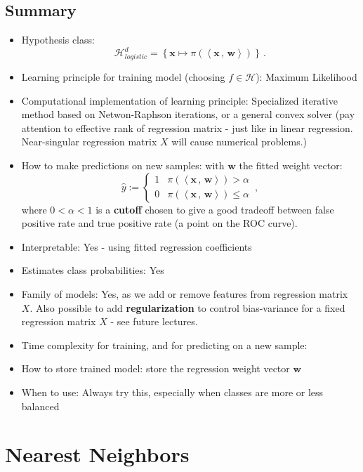\documentclass[11pt]{article}
\newcommand{\Hc}{\mathcal{H}}
\newcommand{\innerr}[2]{{\left\langle #1\,,\,#2 \right\rangle}}
\newcommand{\VV}[1]{\mathbf{#1}}
\begin{document}
\subsection{Summary}
\begin{itemize}
  \item Hypothesis class: 
    \[
	\Hc_{logistic}^d= \left\{ \VV{x} \mapsto \pi(\innerr{\VV{x}}{\VV{w}} ) \right\}\,.
      \]

     \item Learning principle for training model (choosing $f\in\Hc$): Maximum Likelihood 
    \item Computational implementation of learning principle: Specialized
      iterative method based on Netwon-Raphson
      iterations, or a general convex solver
      (pay attention to effective rank of regression matrix -
      just like in linear regression. Near-singular regression matrix $X$ will
    cause numerical problems.)
  \item How to make predictions on new samples: with $\VV{w}$ the fitted weight
    vector:
    \[\hat{y} := \begin{cases} 1 & \pi(\innerr{\VV{x}}{\VV{w}})>\alpha \\ 0 &
    \pi(\innerr{\VV{x}}{\VV{w}}) \leq \alpha \end{cases}\,,\]
    where $0<\alpha<1$ is a {\bf cutoff} chosen to give a good tradeoff between
    false positive rate and true positive rate (a point on the ROC curve).
  \item Interpretable: Yes - using fitted regression coefficients
    \item Estimates class probabilities: Yes
  \item Family of models: Yes, as we add or remove features from regression
    matrix $X$. Also possible to add {\bf regularization} to control
    bias-variance for a fixed regression matrix $X$ - see future lectures. 
     \item Time complexity for training, and for predicting on a new sample:
  \item How to store trained model: store the regression weight vector $\VV{w}$ 
  \item When to use: Always try this, especially when classes are more or less
    balanced
\end{itemize}


\section{Nearest Neighbors}
\end{document}
